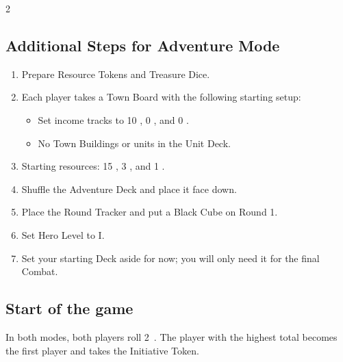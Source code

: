 \begin{expansion}
\begin{multicols}{2}
    \subsection*{Additional Steps for Adventure Mode \hspace*{-1.6em}}
    \begin{enumerate}[leftmargin=1.5em, resume]
      \item Prepare Resource Tokens and Treasure Dice.
      \item Each player takes a Town Board with the following starting setup:
      \begin{itemize}
        \item[a)] Set income tracks to 10 , 0 , and 0 .
        \item[b)] No Town Buildings or units in the Unit Deck.  %
      \end{itemize}
      \item Starting resources: 15 , 3 , and 1 .
      \item Shuffle the Adventure Deck and place it face down.
      \item Place the Round Tracker and put a Black Cube on Round 1.
      \item Set Hero Level to I.
      \item Set your starting Deck aside for now; you will only need it for the final Combat.
    \end{enumerate}

    \subsection*{Start of the game}
    In both modes, both players roll 2~.
    The player with the highest total becomes the first player and takes the Initiative Token.
\end{multicols}


\end{expansion}
